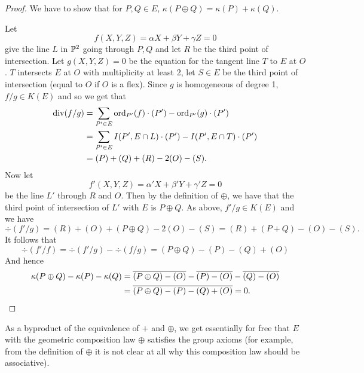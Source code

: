 \begin{proof}
	We have to show that for $P, Q \in E$,
	$\kappa(P \oplus Q) = \kappa(P) + \kappa(Q)$.

	Let
	\begin{equation*}
		f(X, Y, Z) = \alpha X + \beta Y + \gamma Z = 0
	\end{equation*}
	give the line $L$ in $\mathbb{P}^2$ going through $P, Q$ and let $R$ be the third
	point of intersection.
	Let $g(X, Y, Z) = 0$ be the equation for the tangent line $T$ to
	$E$ at $O$. $T$ intersects $E$ at $O$ with
	multiplicity at least 2, let $S \in E$ be the third point of intersection
	(equal to $O$ if $O$ is a flex).
	Since $g$ is homogeneous of degree 1, $f/g \in K(E)$ and so we get that
	\begin{align*}
		\operatorname{div}(f/g) &= \sum_{P' \in E}\operatorname{ord}_{P'}(f)\cdot(P')
		- \operatorname{ord}_{P'}(g)\cdot(P')\\
		&= \sum_{P' \in E}I(P', E\cap L)\cdot(P') - I(P', E\cap T)\cdot(P')\\
		&= (P) + (Q) + (R) - 2(O) - (S).
	\end{align*}
	Now let 
	\begin{equation*}
		f'(X, Y, Z) = \alpha' X + \beta' Y + \gamma' Z = 0
	\end{equation*}
	be the line $L'$ through $R$ and $O$. Then by the definition of $\oplus$,
	we have that the third point of intersection of $L'$ with $E$ is 
	$P \oplus Q$. As above, $f'/g \in K(E)$ and we have
	\begin{equation*}
		\div(f'/g) = (R) + (O) + (P \oplus Q) - 2(O) - (S)
		= (R) + (P + Q) - (O) - (S).
	\end{equation*}
	It follows that
	\begin{equation*}
		\div(f'/f) = \div(f'/g) - \div(f/g) = (P \oplus Q) - (P) - (Q) + (O)
	\end{equation*}
	And hence
	\begin{align*}
		\kappa(P \oplus Q) - \kappa(P) - \kappa(Q) &= 
		\overline{(P \oplus Q) - (O)} - \overline{(P) - (O)} - \overline{(Q) - (O)}\\
		&= \overline{(P \oplus Q) - (P) - (Q) + (O)} = 0.
	\end{align*}
\end{proof}

\begin{remark}
	As a byproduct of the equivalence of $+$ and $\oplus$, we get
	essentially for free that $E$ with the geometric composition law $\oplus$
	satisfies the group axioms (for example, from the definition of
	$\oplus$ it is not clear at all why this composition law should be
	associative).
\end{remark}

